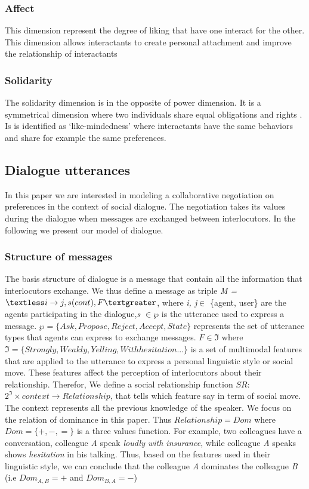 \documentclass{llncs}
\begin{document}
\subsubsection{Affect}
This dimension represent the degree of liking that have one interact for the other. This dimension allows interactants to create personal attachment and improve the relationship of interactants \cite{nicholson2001role}
\subsubsection{Solidarity}
The solidarity dimension is in the opposite of power dimension. It is a symmetrical dimension where two individuals share equal obligations and rights \cite{svennevig2000getting}. Is is identified as ‘like-mindedness’ \cite{bickmore2005establishing} where interactants have the same behaviors and share for example the same preferences.
\subsection{Dialogue utterances}
In this paper we are interested in  modeling a collaborative negotiation on preferences in the context of social dialogue. The negotiation takes its values during the dialogue when messages are exchanged between interlocutors. In the following we present our model of dialogue.
\subsubsection{Structure of messages}
The basis structure of dialogue is a message that contain all the information that interlocutors exchange. We thus define a message as triple \emph{M = $\textless i \rightarrow j, s(cont), F  \textgreater$}, where \emph{i, j}$\in$ \{agent, user\} are the agents participating in the dialogue,\emph{s $\in \wp$}  is the utterance used to express a message. $\wp = \{ Ask, Propose, Reject, Accept, State\}$  represents the set of utterance types \cite{searle1969speech} that agents can express to exchange messages. 
 $F \in \Im $  where $\Im = \{ Strongly, Weakly, Yelling, With hesitation ...\}$ is a set of multimodal features that are applied to the utterance to express a personal linguistic style or social move. These features affect the perception of interlocutors about their relationship. Therefor,  We define a social relationship function $SR$: $2^\Im  \times context \rightarrow Relationship $, that tells which feature say in term of social move. The context represents all the previous knowledge of the speaker. We focus on the relation of dominance in this paper. Thus $Relationship = Dom$ where  $Dom = \{+, -, =\}$ is a three values function. For example, two colleagues have a conversation, colleague \emph{A} speak \textit{loudly with insurance}, while colleague \emph{A} speaks shows \textit{hesitation} in his talking. Thus, based on the features used in their linguistic style, we can conclude that the colleague \emph{A}  dominates  the colleague \emph{B} (i.e $Dom_{A,B} = +$ and $Dom_{B,A} = -$)
 
\end{document}
